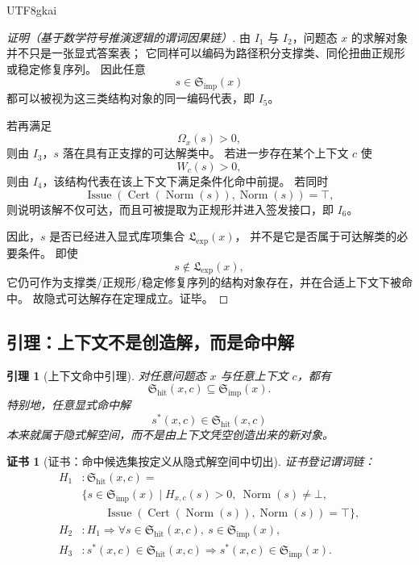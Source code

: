 \documentclass[12pt]{article}
\newtheorem{lemma}{引理}[section]
\newtheorem{Certificate}{证书}[section]
\newcommand{\Norm}{\operatorname{Norm}}
\newcommand{\Cert}{\operatorname{Cert}}
\newcommand{\Issue}{\operatorname{Issue}}
\begin{document}
\begin{CJK*}{UTF8}{gkai}
\begin{proof}[证明（基于数学符号推演逻辑的谓词因果链）]
由 $I_1$ 与 $I_2$，问题态 $x$ 的求解对象并不只是一张显式答案表；
它同样可以编码为路径积分支撑类、同伦扭曲正规形或稳定修复序列。
因此任意
\[
  s\in \mathfrak S_{\mathrm{imp}}(x)
\]
都可以被视为这三类结构对象的同一编码代表，即 $I_5$。

若再满足
\[
  \Omega_x(s)>0,
\]
则由 $I_3$，$s$ 落在具有正支撑的可达解类中。
若进一步存在某个上下文 $c$ 使
\[
  W_c(s)>0,
\]
则由 $I_4$，该结构代表在该上下文下满足条件化命中前提。
若同时
\[
  \Issue(\Cert(\Norm(s)),\Norm(s))=\top,
\]
则说明该解不仅可达，而且可被提取为正规形并进入签发接口，即 $I_6$。

因此，$s$ 是否已经进入显式库项集合 $\mathfrak L_{\mathrm{exp}}(x)$，
并不是它是否属于可达解类的必要条件。
即使
\[
  s\notin \mathfrak L_{\mathrm{exp}}(x),
\]
它仍可作为支撑类/正规形/稳定修复序列的结构对象存在，并在合适上下文下被命中。
故隐式可达解存在定理成立。证毕。
\end{proof}

\subsection{引理：上下文不是创造解，而是命中解}
\label{subsec:tex37-ch15-hit}

\begin{lemma}[上下文命中引理]
\label{lem:tex37-ch15-hit}
对任意问题态 $x$ 与任意上下文 $c$，都有
\[
  \mathfrak S_{\mathrm{hit}}(x,c)\subseteq \mathfrak S_{\mathrm{imp}}(x).
\]
特别地，任意显式命中解
\[
  s^\ast(x,c)\in \mathfrak S_{\mathrm{hit}}(x,c)
\]
本来就属于隐式解空间，而不是由上下文凭空创造出来的新对象。
\end{lemma}

\begin{Certificate}[证书：命中候选集按定义从隐式解空间中切出]
\label{cert:tex37-ch15-hit}
证书登记谓词链：
\[
\begin{aligned}
  H_1 &: \mathfrak S_{\mathrm{hit}}(x,c)=\\
  &\{s\in \mathfrak S_{\mathrm{imp}}(x)\mid H_{x,c}(s)>0,\ \Norm(s)\neq\bot,\\
  &\qquad \Issue(\Cert(\Norm(s)),\Norm(s))=\top\},\\
  H_2 &: H_1\Rightarrow \forall s\in \mathfrak S_{\mathrm{hit}}(x,c),\ s\in \mathfrak S_{\mathrm{imp}}(x),\\
  H_3 &: s^\ast(x,c)\in \mathfrak S_{\mathrm{hit}}(x,c)\Rightarrow s^\ast(x,c)\in \mathfrak S_{\mathrm{imp}}(x).
\end{aligned}
\]
\end{Certificate}


\end{CJK*}
\end{document}
